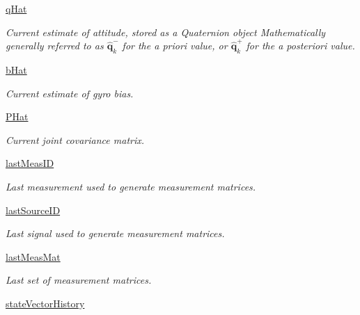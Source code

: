 \begin{DoxyCompactItemize}
\item 
\hyperlink{classmodest_1_1substates_1_1Attitude_1_1Attitude_abdea9adf61992e689fe851e213d63c92}{q\+Hat}
\begin{DoxyCompactList}\small\item\em Current estimate of attitude, stored as a Quaternion object Mathematically generally referred to as $\mathbf{\hat{q}}^{-}_{k}$ for the a priori value, or $\mathbf{\hat{q}}^{+}_{k}$ for the a posteriori value. \end{DoxyCompactList}\item 
\hyperlink{classmodest_1_1substates_1_1Attitude_1_1Attitude_a7d5607d83aae16c591f5b4f6da9cb9c0}{b\+Hat}
\begin{DoxyCompactList}\small\item\em Current estimate of gyro bias. \end{DoxyCompactList}\item 
\hyperlink{classmodest_1_1substates_1_1Attitude_1_1Attitude_a3a3498c5c9f162d42d8f7f0ab9c04f0d}{P\+Hat}
\begin{DoxyCompactList}\small\item\em Current joint covariance matrix. \end{DoxyCompactList}\item 
\hyperlink{classmodest_1_1substates_1_1Attitude_1_1Attitude_a719482b118c5a3a126663c1dc9c8b917}{last\+Meas\+ID}
\begin{DoxyCompactList}\small\item\em Last measurement used to generate measurement matrices. \end{DoxyCompactList}\item 
\hyperlink{classmodest_1_1substates_1_1Attitude_1_1Attitude_a50fa274b70c9184ef95b535919694d50}{last\+Source\+ID}
\begin{DoxyCompactList}\small\item\em Last signal used to generate measurement matrices. \end{DoxyCompactList}\item 
\hyperlink{classmodest_1_1substates_1_1Attitude_1_1Attitude_a2fb7f9e39f2c8e65c73462b222c84bab}{last\+Meas\+Mat}
\begin{DoxyCompactList}\small\item\em Last set of measurement matrices. \end{DoxyCompactList}\item 
\hyperlink{classmodest_1_1substates_1_1SubState_1_1SubState_acb24540b23c1fb76233b6b4ff5bf47ce}{state\+Vector\+History}

\end{DoxyCompactItemize}
